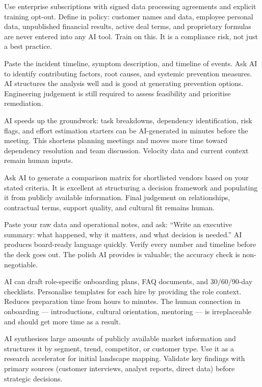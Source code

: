 {Use enterprise subscriptions with signed data processing agreements and explicit
training opt-out.
Define in policy: customer names and data, employee personal data, unpublished
financial results, active deal terms, and proprietary formulas are never entered into
any AI tool.
Train on this.
It is a compliance risk, not just a best practice.}

{Paste the incident timeline, symptom description, and timeline of events.
Ask AI to identify contributing factors, root causes, and systemic prevention measures.
AI structures the analysis well and is good at generating prevention options.
Engineering judgement is still required to assess feasibility and prioritise remediation.}

{AI speeds up the groundwork: task breakdowns, dependency identification, risk flags,
and effort estimation starters can be AI-generated in minutes before the meeting.
This shortens planning meetings and moves more time toward dependency resolution and
team discussion.
Velocity data and current context remain human inputs.}

{Ask AI to generate a comparison matrix for shortlisted vendors based on your
stated criteria.
It is excellent at structuring a decision framework and populating it from publicly
available information.
Final judgement on relationships, contractual terms, support quality, and cultural fit
remains human.}

{Paste your raw data and operational notes, and ask: ``Write an executive summary:
what happened, why it matters, and what decision is needed.''
AI produces board-ready language quickly.
Verify every number and timeline before the deck goes out.
The polish AI provides is valuable; the accuracy check is non-negotiable.}

{AI can draft role-specific onboarding plans, FAQ documents, and 30/60/90-day checklists.
Personalise templates for each hire by providing the role context.
Reduces preparation time from hours to minutes.
The human connection in onboarding --- introductions, cultural orientation, mentoring ---
is irreplaceable and should get more time as a result.}

{AI synthesises large amounts of publicly available market information and structures
it by segment, trend, competitor, or customer type.
Use it as a research accelerator for initial landscape mapping.
Validate key findings with primary sources (customer interviews, analyst reports, direct
data) before strategic decisions.}

